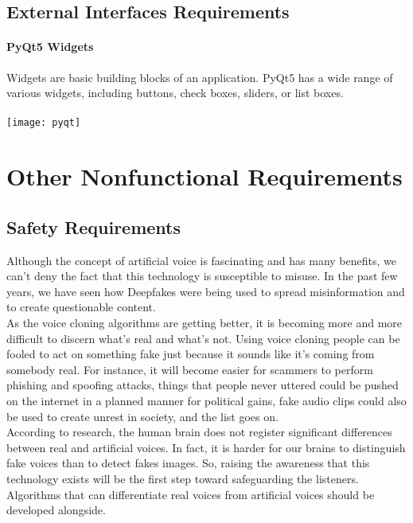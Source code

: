 \documentclass[12pt]{report}
\begin{document}
\section{External Interfaces Requirements}

\subsubsection{PyQt5 Widgets}
Widgets are basic building blocks of an application. PyQt5 has a wide range of various widgets, including buttons, check boxes, sliders, or list boxes.\\
\\
\texttt{[image: pyqt]}
\\




\chapter{Other Nonfunctional Requirements}


\section{Safety Requirements}
Although the concept of artificial voice is fascinating and has many benefits, we can’t deny the fact that this technology is susceptible to misuse. In the past few years, we have seen how Deepfakes were being used to spread misinformation and to create questionable content.\\

As the voice cloning algorithms are getting better, it is becoming more and more difficult to discern what’s real and what’s not. Using voice cloning people can be fooled to act on something fake just because it sounds like it’s coming from somebody real. For instance, it will become easier for scammers to perform phishing and spoofing attacks, things that people never uttered could be pushed on the internet in a planned manner for political gains, fake audio clips could also be used to create unrest in society, and the list goes on.\\

According to research, the human brain does not register significant differences between real and artificial voices. In fact, it is harder for our brains to distinguish fake voices than to detect fakes images. So, raising the awareness that this technology exists will be the first step toward safeguarding the listeners. Algorithms that can differentiate real voices from artificial voices should be developed alongside.\\
\end{document}
